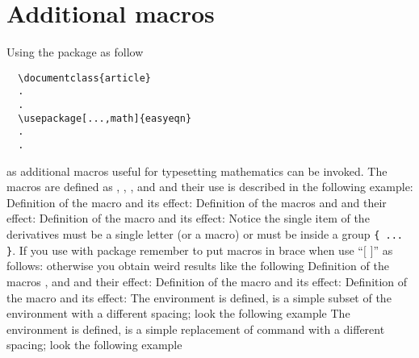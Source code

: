 \documentclass[a4paper,final,11pt]{article}
\begin{document}
\section{Additional macros}
Using the package as follow
\begin{verbatim}
  \documentclass{article}
  .
  .
  \usepackage[...,math]{easyeqn}
  .
  .
\end{verbatim}
as additional macros useful for typesetting mathematics
can be invoked. The macros are defined as , ,
,  and   and their use is described 
in the following example:
Definition of the macro  and its effect:
Definition of the macros  and 
and their effect:
%
Definition of the macro  and its effect:
Notice the single item of the derivatives must be a single letter (or a 
macro) or must be inside a group \verb'{ ... }'.
If you use  with package 
remember to put macros in brace when use ``$[$ $]$'' as follows:
otherwise you obtain weird results like the following
Definition of the macros ,  and 
and their effect:
Definition of the macro  and its effect:
Definition of the macro  and its effect:
The environment  is defined, is a simple subset of the 
environment  with a different spacing; look the following 
example
The environment  is defined, is a simple replacement
of  command with a different spacing; look the following 
example
\end{document}
